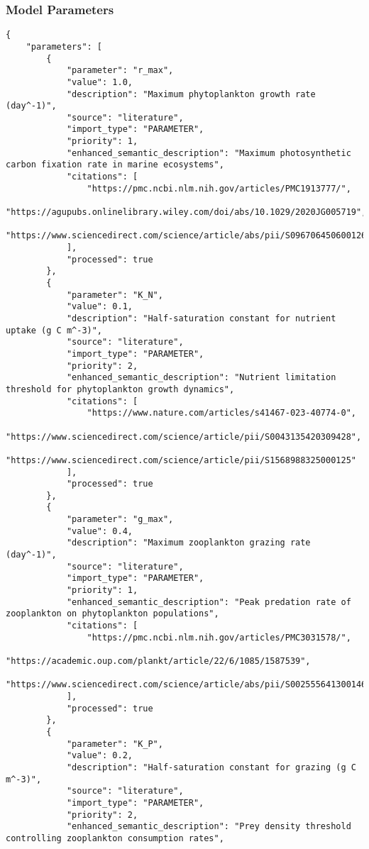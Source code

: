 \subsubsection{Model Parameters}
\begin{lstlisting}
{
    "parameters": [
        {
            "parameter": "r_max",
            "value": 1.0,
            "description": "Maximum phytoplankton growth rate (day^-1)",
            "source": "literature",
            "import_type": "PARAMETER",
            "priority": 1,
            "enhanced_semantic_description": "Maximum photosynthetic carbon fixation rate in marine ecosystems",
            "citations": [
                "https://pmc.ncbi.nlm.nih.gov/articles/PMC1913777/",
                "https://agupubs.onlinelibrary.wiley.com/doi/abs/10.1029/2020JG005719",
                "https://www.sciencedirect.com/science/article/abs/pii/S0967064506001263"
            ],
            "processed": true
        },
        {
            "parameter": "K_N",
            "value": 0.1,
            "description": "Half-saturation constant for nutrient uptake (g C m^-3)",
            "source": "literature",
            "import_type": "PARAMETER",
            "priority": 2,
            "enhanced_semantic_description": "Nutrient limitation threshold for phytoplankton growth dynamics",
            "citations": [
                "https://www.nature.com/articles/s41467-023-40774-0",
                "https://www.sciencedirect.com/science/article/pii/S0043135420309428",
                "https://www.sciencedirect.com/science/article/pii/S1568988325000125"
            ],
            "processed": true
        },
        {
            "parameter": "g_max",
            "value": 0.4,
            "description": "Maximum zooplankton grazing rate (day^-1)",
            "source": "literature",
            "import_type": "PARAMETER",
            "priority": 1,
            "enhanced_semantic_description": "Peak predation rate of zooplankton on phytoplankton populations",
            "citations": [
                "https://pmc.ncbi.nlm.nih.gov/articles/PMC3031578/",
                "https://academic.oup.com/plankt/article/22/6/1085/1587539",
                "https://www.sciencedirect.com/science/article/abs/pii/S0025556413001466"
            ],
            "processed": true
        },
        {
            "parameter": "K_P",
            "value": 0.2,
            "description": "Half-saturation constant for grazing (g C m^-3)",
            "source": "literature",
            "import_type": "PARAMETER",
            "priority": 2,
            "enhanced_semantic_description": "Prey density threshold controlling zooplankton consumption rates",

\end{lstlisting}
